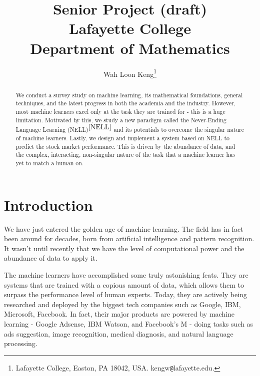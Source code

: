 \documentclass[12pt]{article}  %
\begin{document}
\title{Senior Project (draft)\\
Lafayette College \\
Department of Mathematics
}

\author{
{Wah Loon Keng}\thanks{
Lafayette College,
Easton, PA 18042, USA.
kengw{\tt @}lafayette.edu.}
}
\maketitle


\begin{abstract}
We conduct a survey study on machine learning, its mathematical foundations, general techniques, and the latest progress in both the academia and the industry. However, most machine learners  excel only at the task they are trained for - this is a huge limitation. Motivated by this, we study a new paradigm called the Never-Ending Language Learning (NELL)$^{\ref{NELL}}$ and its potentials to overcome the singular nature of machine learners. Lastly, we design and implement a system based on NELL to predict the stock market performance. This is driven by the abundance of data, and the complex, interacting, non-singular nature of the task that a machine learner has yet to match a human on.
\end{abstract}


\clearpage
\tableofcontents
\clearpage


\section{Introduction} \label{intro}

We have just entered the golden age of machine learning. The field has in fact been around for decades, born from artificial intelligence and pattern recognition. It wasn't until recently that we have the level of computational power and the abundance of data to apply it. 

The machine learners have accomplished some truly astonishing feats. They are systems that are trained with a copious amount of data, which allows them to surpass the performance level of human experts. Today, they are actively being researched and deployed by the biggest tech companies such as Google, IBM, Microsoft, Facebook. In fact, their major products are powered by machine learning - Google Adsense, IBM Watson, and Facebook's M - doing tasks such as ads suggestion, image recognition, medical diagnosis, and natural language processing.
\end{document}
